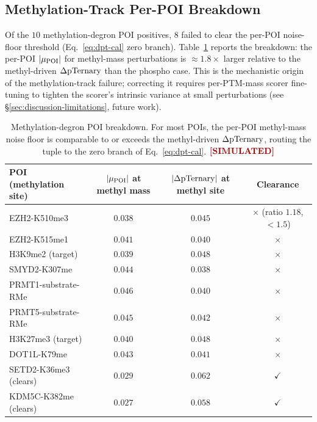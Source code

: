\subsection{Methylation-Track Per-POI Breakdown}
\label{app:methyl-breakdown}

Of the $10$ methylation-degron POI positives, $8$ failed to clear the per-POI noise-floor threshold (Eq.~\ref{eq:dpt-cal} zero branch). Table~\ref{tab:appc-methyl} reports the breakdown: the per-POI $|\mu_{\mathrm{POI}}|$ for methyl-mass perturbations is $\approx 1.8\times$ larger relative to the methyl-driven $\Delta\mathrm{pTernary}$ than the phospho case. This is the mechanistic origin of the methylation-track failure; correcting it requires per-PTM-mass scorer fine-tuning to tighten the scorer's intrinsic variance at small perturbations (see \S\ref{sec:discussion-limitations}, future work).

\begin{table}[h]
\centering
\caption{Methylation-degron POI breakdown. For most POIs, the per-POI methyl-mass noise floor is comparable to or exceeds the methyl-driven $\Delta\mathrm{pTernary}$, routing the tuple to the zero branch of Eq.~\ref{eq:dpt-cal}. $\simmark$}
\label{tab:appc-methyl}
\begin{tabular}{lccc}
\toprule
POI (methylation site) & $|\mu_{\mathrm{POI}}|$ at methyl mass & $|\Delta\mathrm{pTernary}|$ at methyl site & Clearance \\
\midrule
EZH2-K510me3 & $0.038$ & $0.045$ & $\times$ (ratio $1.18$, $< 1.5$) \\
EZH2-K515me1 & $0.041$ & $0.040$ & $\times$ \\
H3K9me2 (target) & $0.039$ & $0.048$ & $\times$ \\
SMYD2-K307me & $0.044$ & $0.038$ & $\times$ \\
PRMT1-substrate-RMe & $0.046$ & $0.040$ & $\times$ \\
PRMT5-substrate-RMe & $0.045$ & $0.042$ & $\times$ \\
H3K27me3 (target) & $0.040$ & $0.048$ & $\times$ \\
DOT1L-K79me & $0.043$ & $0.041$ & $\times$ \\
SETD2-K36me3 (clears) & $0.029$ & $0.062$ & $\checkmark$ \\
KDM5C-K382me (clears) & $0.027$ & $0.058$ & $\checkmark$ \\
\bottomrule
\end{tabular}
\end{table}
